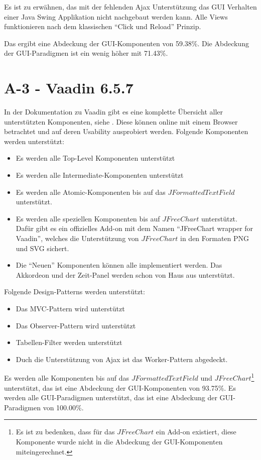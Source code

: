 Es ist zu erwähnen, das mit der fehlenden \ac{Ajax} Unterstützung das
\ac{GUI} Verhalten einer Java Swing Applikation nicht nachgebaut werden kann.
Alle Views funktionieren nach dem klassischen ``Click und Reload'' Prinzip.

Das ergibt eine Abdeckung der GUI-Komponenten von 59.38\%. Die Abdeckung der
GUI-Paradigmen ist ein wenig höher mit 71.43\%.

\section{A-3 - Vaadin 6.5.7}

In der Dokumentation zu Vaadin gibt es eine komplette Übersicht aller
unterstützten Komponenten, siehe \cite{VaadinKomponenten}. Diese können online
mit einem Browser betrachtet und auf deren Usability ausprobiert werden.
Folgende Komponenten werden unterstützt:

\begin{itemize}
  \item Es werden alle Top-Level Komponenten unterstützt
  \item Es werden alle Intermediate-Komponenten unterstützt
  \item Es werden alle Atomic-Komponenten bis auf das
  \(JFormattedTextField\) unterstützt.
  \item Es werden alle speziellen Komponenten bis auf
  \(JFreeChart\) unterstützt. Dafür gibt es ein offizielles
  Add-on mit dem Namen ``JFreeChart wrapper for Vaadin'', welches die
  Unterstützung von \(JFreeChart\) in den Formaten \ac{PNG} und \ac{SVG}
  sichert.
  \item Die ``Neuen'' Komponenten können alle implementiert werden. Das
  Akkordeon und der Zeit-Panel werden schon von Haus aus unterstützt.
\end{itemize}

Folgende Design-Patterns werden unterstützt:

\begin{itemize}
  \item Das MVC-Pattern wird unterstützt
  \item Das Observer-Pattern wird unterstützt
  \item Tabellen-Filter werden unterstützt
  \item Duch die Unterstützung von Ajax ist das Worker-Pattern abgedeckt.
\end{itemize}

Es werden alle Komponenten bis auf das \(JFormattedTextField\) und
\(JFreeChart\)\footnote{Es ist zu bedenken, dass für das \(JFreeChart\) ein
Add-on existiert, diese Komponente wurde nicht in die Abdeckung der
GUI-Komponenten miteingerechnet.} unterstützt, das ist eine Abdeckung der
GUI-Komponenten von 93.75\%. Es werden alle GUI-Paradigmen unterstützt, das ist
eine Abdeckung der GUI-Paradigmen von 100.00\%.

